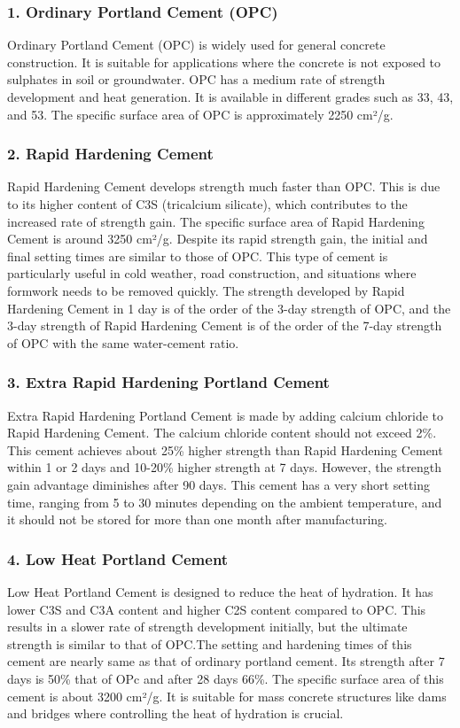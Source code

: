 \documentclass[a4paper,11pt]{book}
\begin{document}
\subsubsection{1. Ordinary Portland Cement (OPC)}
Ordinary Portland Cement (OPC) is widely used for general concrete construction. It is suitable for applications where the concrete is not exposed to sulphates in soil or groundwater. OPC has a medium rate of strength development and heat generation. It is available in different grades such as 33, 43, and 53. The specific surface area of OPC is approximately 2250 cm²/g.

\subsubsection{2. Rapid Hardening Cement}
Rapid Hardening Cement develops strength much faster than OPC. This is due to its higher content of C3S (tricalcium silicate), which contributes to the increased rate of strength gain. The specific surface area of Rapid Hardening Cement is around 3250 cm²/g. Despite its rapid strength gain, the initial and final setting times are similar to those of OPC. This type of cement is particularly useful in cold weather, road construction, and situations where formwork needs to be removed quickly. The strength developed by Rapid Hardening Cement in 1 day is of the order of the 3-day strength of OPC, and the 3-day strength of Rapid Hardening Cement is of the order of the 7-day strength of OPC with the same water-cement ratio.

\subsubsection{3. Extra Rapid Hardening Portland Cement}
Extra Rapid Hardening Portland Cement is made by adding calcium chloride to Rapid Hardening Cement. The calcium chloride content should not exceed 2\%. This cement achieves about 25\% higher strength than Rapid Hardening Cement within 1 or 2 days and 10-20\% higher strength at 7 days. However, the strength gain advantage diminishes after 90 days. This cement has a very short setting time, ranging from 5 to 30 minutes depending on the ambient temperature, and it should not be stored for more than one month after manufacturing.

\subsubsection{4. Low Heat Portland Cement}
Low Heat Portland Cement is designed to reduce the heat of hydration. It has lower C3S and C3A content and higher C2S content compared to OPC. This results in a slower rate of strength development initially, but the ultimate strength is similar to that of OPC.The setting and hardening times of this cement are nearly same as that of ordinary portland cement.
Its strength after 7 days is 50\% that of OPc and after 28 days 66\%. The specific surface area of this cement is about 3200 cm²/g. It is suitable for mass concrete structures like dams and bridges where controlling the heat of hydration is crucial.
\end{document}
